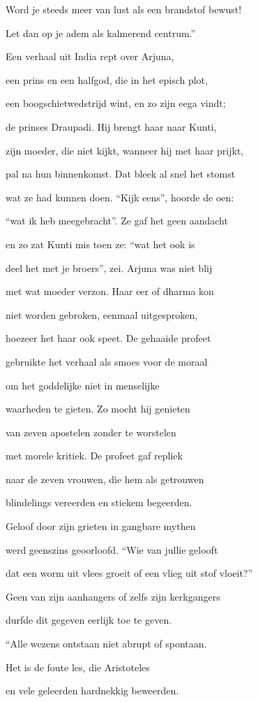 Word je steeds meer van lust
als een brandstof bewust!

Let dan op je adem
als kalmerend centrum.”

Een verhaal uit India
rept over Arjuna,

een prins en een halfgod,
die in het episch plot,

een boogschietwedstrijd wint,
en zo zijn eega vindt;

de prinses Draupadi.
Hij brengt haar naar Kunti,

zijn moeder, die niet kijkt,
wanneer hij met haar prijkt,

pal na hun binnenkomst.
Dat bleek al snel het stomst

wat ze had kunnen doen.
“Kijk eens”, hoorde de oen:

“wat ik heb meegebracht”.
Ze gaf het geen aandacht

en zo zat Kunti mis
toen ze: “wat het ook is

deel het met je broers”, zei.
Arjuna was niet blij

met wat moeder verzon.
Haar eer of dharma kon

niet worden gebroken,
eenmaal uitgesproken,

hoezeer het haar ook speet.
De gehaaide profeet

gebruikte het verhaal
als smoes voor de moraal

om het goddelijke
niet in menselijke

waarheden te gieten.
Zo mocht hij genieten

van zeven apostelen
zonder te worstelen

met morele kritiek.
De profeet gaf repliek

naar de zeven vrouwen,
die hem als getrouwen

blindelings vereerden
en stiekem begeerden.

Geloof door zijn grieten
in gangbare mythen

werd geenszins geoorloofd.
“Wie van jullie gelooft

dat een worm uit vlees groeit
of een vlieg uit stof vloeit?”

Geen van zijn aanhangers
of zelfs zijn kerkgangers

durfde dit gegeven
eerlijk toe te geven.

“Alle wezens ontstaan
niet abrupt of spontaan.

Het is de foute les,
die Aristoteles

en vele geleerden
hardnekkig beweerden.

